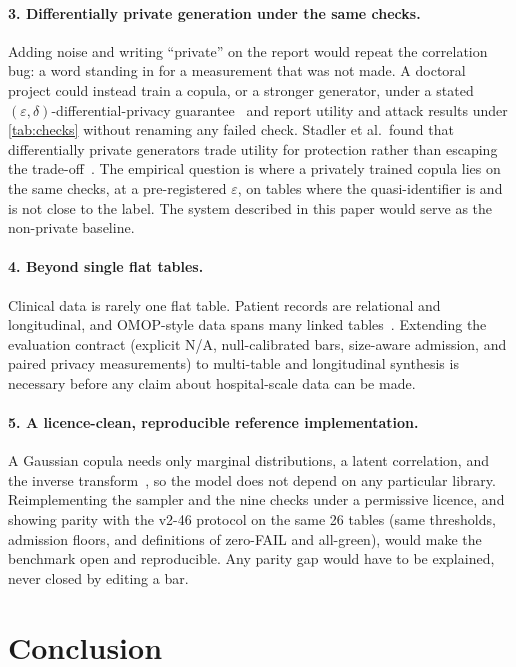 \documentclass[11pt,a4paper]{article}
\begin{document}
\paragraph{3. Differentially private generation under the same checks.}
Adding noise and writing ``private'' on the report would repeat the correlation bug: a word standing in for a measurement that was not made. A doctoral project could instead train a copula, or a stronger generator, under a stated $(\varepsilon,\delta)$-differential-privacy guarantee~\cite{dwork2006} and report utility and attack results under \cref{tab:checks} without renaming any failed check. Stadler et al.\ found that differentially private generators trade utility for protection rather than escaping the trade-off~\cite{stadler2022}. The empirical question is where a privately trained copula lies on the same checks, at a pre-registered $\varepsilon$, on tables where the quasi-identifier is and is not close to the label. The system described in this paper would serve as the non-private baseline.

\paragraph{4. Beyond single flat tables.}
Clinical data is rarely one flat table. Patient records are relational and longitudinal, and OMOP-style data spans many linked tables~\cite{hripcsak2015}. Extending the evaluation contract (explicit N/A, null-calibrated bars, size-aware admission, and paired privacy measurements) to multi-table and longitudinal synthesis is necessary before any claim about hospital-scale data can be made.

\paragraph{5. A licence-clean, reproducible reference implementation.}
A Gaussian copula needs only marginal distributions, a latent correlation, and the inverse transform~\cite{sklar1959,patki2016}, so the model does not depend on any particular library. Reimplementing the sampler and the nine checks under a permissive licence, and showing parity with the v2-46 protocol on the same 26 tables (same thresholds, admission floors, and definitions of zero-FAIL and all-green), would make the benchmark open and reproducible. Any parity gap would have to be explained, never closed by editing a bar.

\section{Conclusion}\label{sec:conclusion}
\end{document}

